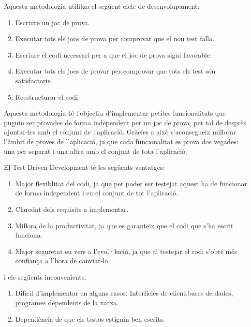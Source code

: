 \newpage

Aquesta metodologia utilitza el següent cicle de desenvolupament: 

\begin{enumerate}
    \item{Escriure un joc de prova.}
    \item{Executar tots els jocs de prova per comprovar que el nou test falla.}
    \item{Escriure el codi necessari per a que el joc de prova sigui favorable.}
    \item{Executar tots els jocs de provar per comprovar que tots els test són satisfactoris.}
    \item{Reestructurar el codi}
\end{enumerate}

Aquesta metodologia té l'objectiu d'implementar petites funcionalitats que puguin ser provades de forma independent per un joc de prova, per tal de desprès ajuntar-les amb el conjunt de l'aplicació. Gràcies a això s'aconsegueix millorar l'àmbit de proves de l'aplicació, ja que cada funcionalitat es prova dos vegades: una per separat i una altra amb el conjunt de tota l'aplicació.  

El Test Driven Development té les següents ventatges: 

\begin{enumerate}
    \item{Major flexiblitat del codi, ja que per poder ser testejat aquest ha de funcionar de forma independent i en el conjunt de tot l'aplicació.}
    \item{Claredat dels requisits a implementar.}
    \item{Millora de la productivitat, ja que es garanteix que el codi que s'ha escrit funciona.}
    \item{Major seguretat en vers a l'evol·lució, ja que al testejar el codi s'obté més confiança a l'hora de canviar-lo.}
\end{enumerate}

i els següents inconvenients: 

\begin{enumerate}
    \item{Difícil d'implementar en alguns casos: Interfícies de client,bases de dades, programes dependents de la xarxa.}
    \item{Dependència de que els testos estiguin ben escrits. }
\end{enumerate}

